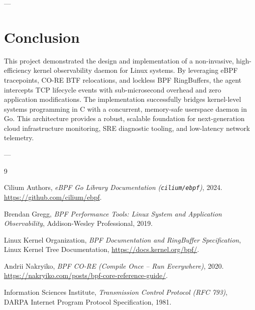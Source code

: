 \documentclass[11pt,a4paper]{article}
\begin{document}
---

\section{Conclusion}

This project demonstrated the design and implementation of a non-invasive, high-efficiency kernel observability daemon for Linux systems. By leveraging eBPF tracepoints, CO-RE BTF relocations, and lockless BPF RingBuffers, the agent intercepts TCP lifecycle events with sub-microsecond overhead and zero application modifications. The implementation successfully bridges kernel-level systems programming in C with a concurrent, memory-safe userspace daemon in Go. This architecture provides a robust, scalable foundation for next-generation cloud infrastructure monitoring, SRE diagnostic tooling, and low-latency network telemetry.

---

\begin{thebibliography}{9}

Cilium Authors, \emph{eBPF Go Library Documentation (\texttt{cilium/ebpf})}, 2024. \url{https://github.com/cilium/ebpf}.

Brendan Gregg, \emph{BPF Performance Tools: Linux System and Application Observability}, Addison-Wesley Professional, 2019.

Linux Kernel Organization, \emph{BPF Documentation and RingBuffer Specification}, Linux Kernel Tree Documentation, \url{https://docs.kernel.org/bpf/}.

Andrii Nakryiko, \emph{BPF CO-RE (Compile Once -- Run Everywhere)}, 2020. \url{https://nakryiko.com/posts/bpf-core-reference-guide/}.

Information Sciences Institute, \emph{Transmission Control Protocol (RFC 793)}, DARPA Internet Program Protocol Specification, 1981.

\end{thebibliography}
\end{document}
